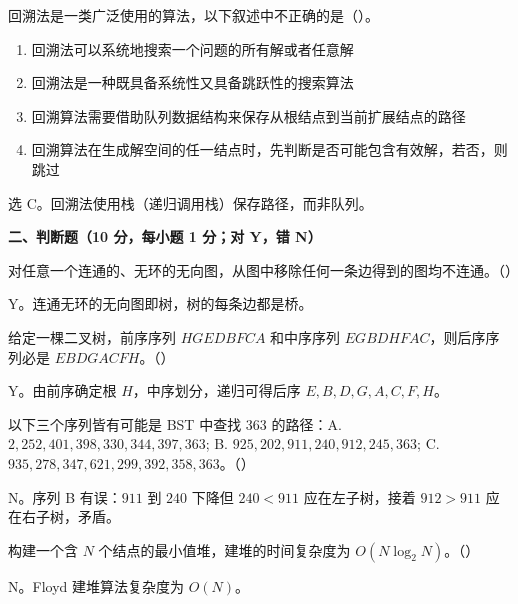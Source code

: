 \begin{question}
回溯法是一类广泛使用的算法，以下叙述中不正确的是（\quad）。
\begin{enumerate}
  \item 回溯法可以系统地搜索一个问题的所有解或者任意解
  \item 回溯法是一种既具备系统性又具备跳跃性的搜索算法
  \item 回溯算法需要借助队列数据结构来保存从根结点到当前扩展结点的路径
  \item 回溯算法在生成解空间的任一结点时，先判断是否可能包含有效解，若否，则跳过
\end{enumerate}
\begin{solution}
选 C。回溯法使用栈（递归调用栈）保存路径，而非队列。
\end{solution}
\end{question}

\clearpage

\textbf{二、判断题（10 分，每小题 1 分；对 Y，错 N）}

\begin{question}
对任意一个连通的、无环的无向图，从图中移除任何一条边得到的图均不连通。（\quad）
\begin{solution}
Y。连通无环的无向图即树，树的每条边都是桥。
\end{solution}
\end{question}

\begin{question}
给定一棵二叉树，前序序列 $HGEDBFCA$ 和中序序列 $EGBDHFAC$，则后序序列必是 $EBDGACFH$。（\quad）
\begin{solution}
Y。由前序确定根 $H$，中序划分，递归可得后序 $E,B,D,G,A,C,F,H$。
\end{solution}
\end{question}

\begin{question}
以下三个序列皆有可能是 BST 中查找 $363$ 的路径：A. $2,252,401,398,330,344,397,363$; B. $925,202,911,240,912,245,363$; C. $935,278,347,621,299,392,358,363$。（\quad）
\begin{solution}
N。序列 B 有误：$911$ 到 $240$ 下降但 $240<911$ 应在左子树，接着 $912>911$ 应在右子树，矛盾。
\end{solution}
\end{question}

\begin{question}
构建一个含 $N$ 个结点的最小值堆，建堆的时间复杂度为 $O(N\log_2 N)$。（\quad）
\begin{solution}
N。Floyd 建堆算法复杂度为 $O(N)$。
\end{solution}
\end{question}

